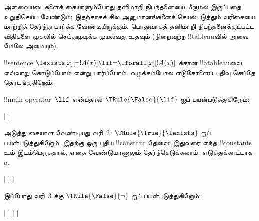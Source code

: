 \documentclass[../../../include/open-logic-section]{subfiles}
\begin{document}


\begin{ex}
அளவையடைகளைக் கையாளும்போது தனிமாறி நிபந்தனையை மீறாமல் இருப்பதை உறுதிசெய்ய
வேண்டும்; இதற்காகச் சில அனுமானங்களைச் செயல்படுத்தும் வரிசையை மாற்றித் தேர்ந்து
பார்க்க வேண்டியிருக்கும். பொதுவாகத் தனிமாறி நிபந்தனைக்குட்பட்ட விதிகளை முதலில்
செய்துமுடிக்க முயல்வது உதவும் (நிறைவுற்ற !!{tableau}வில் அவை மேலே அமையும்).

!!{sentence} $\lexists[x][\lnot !A(x)] \lif \lnot \lforall[x][!A(x)]$
க்கான !!a{tableau}வை எவ்வாறு கொடுப்போம் என்று பார்ப்போம். வழக்கம்போல எடுகோளைப்
பதிவு செய்தே தொடங்குகிறோம்:
\begin{oltableau}
[\sFmla{\False}{\lexists[x][\lnot \formula{A}(x)]\lif \lnot
    \lforall[x][\formula{A}(x)]}, just=\TAss]
\end{oltableau}
!!{main operator}~$\lif$ என்பதால் $\TRule{\False}{\lif}$ ஐப் பயன்படுத்துகிறோம்:
\begin{oltableau}
[\sFmla{\False}{\lexists[x][\lnot \formula{A}(x)]\lif \lnot
    \lforall[x][\formula{A}(x)]}, just=\TAss, checked
  [\sFmla{\True}{\lexists[x][\lnot \formula{A}(x)]},
    just={\TRule{\False}{\lif}[1]}
    [\sFmla{\False}{\lnot\lforall[x][\formula{A}(x)]},
      just={\TRule{\False}{\lif}[1]}]
  ]
]
\end{oltableau}

அடுத்து கையாள வேண்டியது வரி~$2$. $\TRule{\True}{\lexists}$ ஐப்
பயன்படுத்துகிறோம். இதற்கு ஒரு புதிய !!{constant} தேவை; இதுவரை எந்த
!!{constant}s உம் இடம்பெறாததால், எதை வேண்டுமானாலும் தேர்ந்தெடுக்கலாம்;
எடுத்துக்காட்டாக~$a$.
\begin{oltableau}
[\sFmla{\False}{\lexists[x][\lnot \formula{A}(x)]\lif \lnot
    \lforall[x][\formula{A}(x)]}, just=\TAss, checked
  [\sFmla{\True}{\lexists[x][\lnot \formula{A}(x)]},
    just={\TRule{\False}{\lif}[1]}, checked
    [\sFmla{\False}{\lnot\lforall[x][\formula{A}(x)]},
      just={\TRule{\False}{\lif}[1]}
      [\sFmla{\True}{\lnot\formula{A}(a)}, just={\TRule{\True}{\lexists}[2]}]
    ]
  ]
]
\end{oltableau}

இப்போது வரி~$3$ க்கு $\TRule{\False}{\lnot}$ ஐப் பயன்படுத்துகிறோம்:
\begin{oltableau}
[\sFmla{\False}{\lexists[x][\lnot \formula{A}(x)]\lif \lnot
    \lforall[x][\formula{A}(x)]}, just=\TAss, checked
  [\sFmla{\True}{\lexists[x][\lnot \formula{A}(x)]},
    just={\TRule{\False}{\lif}[1]}, checked
    [\sFmla{\False}{\lnot\lforall[x][\formula{A}(x)]},
      just={\TRule{\False}{\lif}[1]}, checked
      [\sFmla{\True}{\lnot\formula{A}(a)}, just={\TRule{\True}{\lexists}[2]}
        [\sFmla{\True}{\lforall[x][\formula{A}(x)]},
          just = {\TRule{\False}{\lnot}[3]}
        ]
      ]
    ]
  ]
]
\end{oltableau}


\end{ex}
\end{document}
